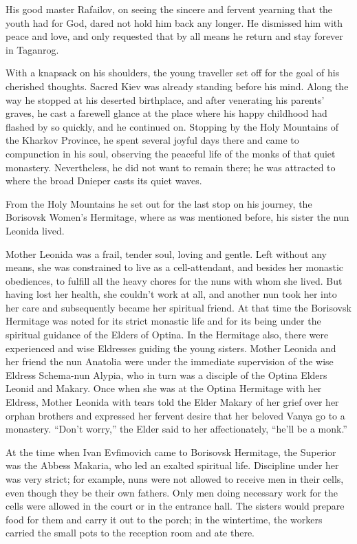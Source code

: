 His good master Rafailov, on seeing the sincere and fervent yearning that the youth had for God, dared not hold him back any longer. He dismissed him with peace and love, and only requested that by all means he return and stay forever in Taganrog.

With a knapsack on his shoulders, the young traveller set off for the goal of his cherished thoughts. Sacred Kiev was already standing before his mind. Along the way he stopped at his deserted birthplace, and after venerating his parents' graves, he cast a farewell glance at the place where his happy childhood had flashed by so quickly, and he continued on. Stopping by the Holy Mountains of the Kharkov Province, he spent several joyful days there and came to compunction in his soul, observing the peaceful life of the monks of that quiet monastery. Nevertheless, he did not want to remain there; he was attracted to where the broad Dnieper casts its quiet waves.

From the Holy Mountains he set out for the last stop on his journey, the Borisovsk Women's Hermitage, where as was mentioned before, his sister the nun Leonida lived.

Mother Leonida was a frail, tender soul, loving and gentle. Left without any means, she was constrained to live as a cell-attendant, and besides her monastic obediences, to fulfill all the heavy chores for the nuns with whom she lived. But having lost her health, she couldn't work at all, and another nun took her into her care and subsequently became her spiritual friend. At that time the Borisovsk Hermitage was noted for its strict monastic life and for its being under the spiritual guidance of the Elders of Optina. In the Hermitage also, there were experienced and wise Eldresses guiding the young sisters. Mother Leonida and her friend the nun Anatolia were under the immediate supervision of the wise Eldress Schema-nun Alypia, who in turn was a disciple of the Optina Elders Leonid and Makary. Once when she was at the Optina Hermitage with her Eldress, Mother Leonida with tears told the Elder Makary of her grief over her orphan brothers and expressed her fervent desire that her beloved Vanya go to a monastery. ``Don't worry,'' the Elder said to her affectionately, ``he'll be a monk.''

At the time when Ivan Evfimovich came to Borisovsk Hermitage, the Superior was the Abbess Makaria, who led an exalted spiritual life. Discipline under her was very strict; for example, nuns were not allowed to receive men in their cells, even though they be their own fathers. Only men doing necessary work for the cells were allowed in the court or in the entrance hall. The sisters would prepare food for them and carry it out to the porch; in the wintertime, the workers carried the small pots to the reception room and ate there.

